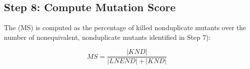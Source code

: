 %
%

\subsection{Step 8: Compute Mutation Score}
\label{sec:appr:score}


The  (MS) is computed as the percentage of killed nonduplicate mutants
over the number of nonequivalent, nonduplicate mutants identified in Step 7):

\begin{equation}
\label{equation:ms}
\mathit{MS} = \frac{|\mathit{KND}|}{|\mathit{LNEND}|+|\mathit{KND}|}
\end{equation}
%
%
%
